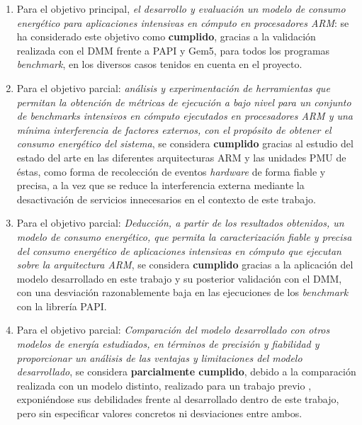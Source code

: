 \begin{enumerate}
\item Para el objetivo principal, \emph{el desarrollo y evaluación un modelo de consumo energético para aplicaciones intensivas en cómputo en procesadores \ac{ARM}}: se ha considerado este objetivo como \textbf{cumplido}, gracias a la validación realizada con el DMM frente a PAPI y Gem5, para todos los programas \textit{benchmark}, en los diversos casos tenidos en cuenta en el proyecto.

\item Para el objetivo parcial: \emph{análisis y experimentación de herramientas que permitan la obtención de métricas de ejecución a bajo nivel para un conjunto de \textit{benchmarks} intensivos en cómputo ejecutados en procesadores \ac{ARM} y una mínima interferencia de factores externos, con el propósito de obtener el consumo energético del sistema}, se considera \textbf{cumplido} gracias al estudio del estado del arte en las diferentes arquitecturas \ac{ARM} y las unidades \ac{PMU} de éstas, como forma de recolección de eventos \textit{hardware} de forma fiable y precisa, a la vez que se reduce la interferencia externa mediante la desactivación de servicios innecesarios en el contexto de este trabajo.

\item Para el objetivo parcial: \emph{Deducción, a partir de los resultados obtenidos, un modelo de consumo energético, que permita la caracterización fiable y precisa del consumo energético de aplicaciones intensivas en cómputo que ejecutan sobre la arquitectura \ac{ARM}}, se considera \textbf{cumplido} gracias a la aplicación del modelo desarrollado en este trabajo y su posterior validación con el DMM, con una desviación razonablemente baja en las ejecuciones de los \textit{benchmark} con la librería PAPI.

\item Para el objetivo parcial: \emph{Comparación del modelo desarrollado con otros modelos de energía estudiados, en términos de precisión y fiabilidad y proporcionar un análisis de las ventajas y limitaciones del modelo desarrollado}, se considera \textbf{parcialmente cumplido}, debido a la comparación realizada con un modelo distinto, realizado para un trabajo previo \cite{antoniomateo}, exponiéndose sus debilidades frente al desarrollado dentro de este trabajo, pero sin especificar valores concretos ni desviaciones entre ambos.

\end{enumerate}

